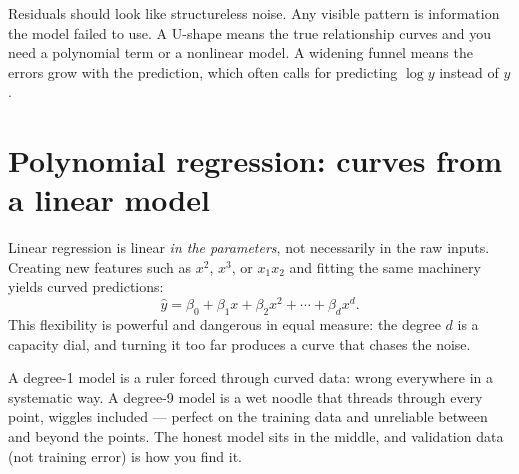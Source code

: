 \begin{keyidea}
Residuals should look like structureless noise. Any visible pattern is information the model failed to use. A U-shape means the true relationship curves and you need a polynomial term or a nonlinear model. A widening funnel means the errors grow with the prediction, which often calls for predicting $\log y$ instead of $y$.
\end{keyidea}

\section{Polynomial regression: curves from a linear model}

Linear regression is linear \emph{in the parameters}, not necessarily in the raw inputs. Creating new features such as $x^2$, $x^3$, or $x_1x_2$ and fitting the same machinery yields curved predictions:
\[
  \hat{y}=\beta_0+\beta_1x+\beta_2x^2+\cdots+\beta_dx^d.
\]
This flexibility is powerful and dangerous in equal measure: the degree $d$ is a capacity dial, and turning it too far produces a curve that chases the noise.

\begin{mlfigure}
\end{mlfigure}

\begin{intuition}
A degree-1 model is a ruler forced through curved data: wrong everywhere in a systematic way. A degree-9 model is a wet noodle that threads through every point, wiggles included --- perfect on the training data and unreliable between and beyond the points. The honest model sits in the middle, and validation data (not training error) is how you find it.
\end{intuition}

